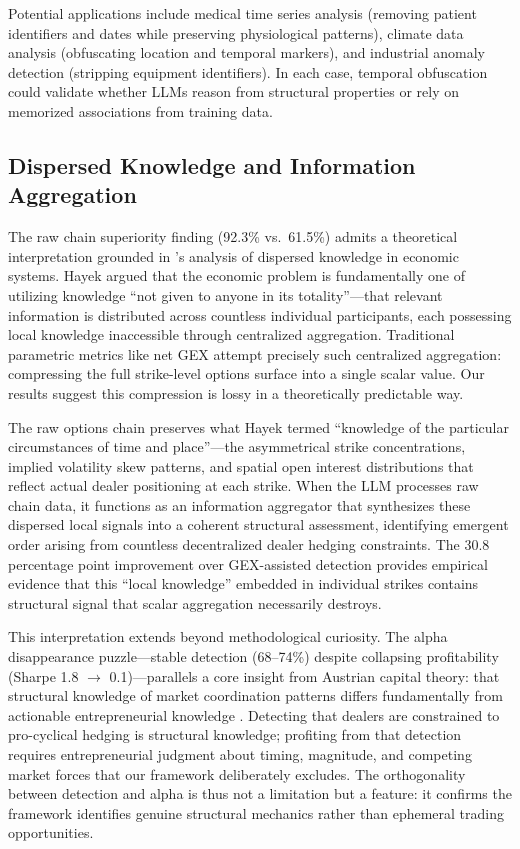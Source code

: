 Potential applications include medical time series analysis (removing patient identifiers and dates while preserving physiological patterns), climate data analysis (obfuscating location and temporal markers), and industrial anomaly detection (stripping equipment identifiers). In each case, temporal obfuscation could validate whether LLMs reason from structural properties or rely on memorized associations from training data.

\subsection{Dispersed Knowledge and Information Aggregation}

The raw chain superiority finding (92.3\% vs.\ 61.5\%) admits a theoretical interpretation grounded in \citet{hayek1945}'s analysis of dispersed knowledge in economic systems. Hayek argued that the economic problem is fundamentally one of utilizing knowledge ``not given to anyone in its totality''---that relevant information is distributed across countless individual participants, each possessing local knowledge inaccessible through centralized aggregation. Traditional parametric metrics like net GEX attempt precisely such centralized aggregation: compressing the full strike-level options surface into a single scalar value. Our results suggest this compression is lossy in a theoretically predictable way.

The raw options chain preserves what Hayek termed ``knowledge of the particular circumstances of time and place''---the asymmetrical strike concentrations, implied volatility skew patterns, and spatial open interest distributions that reflect actual dealer positioning at each strike. When the LLM processes raw chain data, it functions as an information aggregator that synthesizes these dispersed local signals into a coherent structural assessment, identifying emergent order arising from countless decentralized dealer hedging constraints. The 30.8 percentage point improvement over GEX-assisted detection provides empirical evidence that this ``local knowledge'' embedded in individual strikes contains structural signal that scalar aggregation necessarily destroys.

This interpretation extends beyond methodological curiosity. The alpha disappearance puzzle---stable detection (68--74\%) despite collapsing profitability (Sharpe 1.8 $\rightarrow$ 0.1)---parallels a core insight from Austrian capital theory: that structural knowledge of market coordination patterns differs fundamentally from actionable entrepreneurial knowledge \citep{kirzner1973competition}. Detecting that dealers are constrained to pro-cyclical hedging is structural knowledge; profiting from that detection requires entrepreneurial judgment about timing, magnitude, and competing market forces that our framework deliberately excludes. The orthogonality between detection and alpha is thus not a limitation but a feature: it confirms the framework identifies genuine structural mechanics rather than ephemeral trading opportunities.

